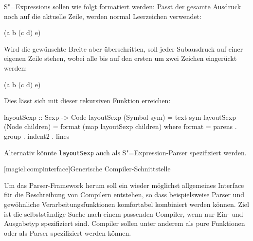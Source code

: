 \documentclass[11pt, a4paper, bibgerm]{scrbook}
\newcommand\icode[1]{\lstinline?#1?}
\newcommand\lsection{}
\newcommand{\sexp}{S"=Expression}
\newcommand{\sexps}{S"=Expressions}
\begin{document}
\sexps{} sollen wie folgt formatiert werden: Passt der gesamte Ausdruck
noch auf die aktuelle Zeile, werden normal Leerzeichen verwendet:
\begin{code}
(a b (c d) e)
\end{code}
Wird die gewünschte Breite aber überschritten, soll jeder Subausdruck
auf einer eigenen Zeile stehen, wobei alle bis auf den ersten um zwei
Zeichen eingerückt werden:
\begin{code}
(a
  b
  (c d)
  e)
\end{code}
Dies lässt sich mit dieser rekursiven Funktion erreichen:
\begin{code}
layoutSexp :: Sexp -> Code
layoutSexp (Symbol sym)    = text sym
layoutSexp (Node children) = format (map layoutSexp children)
  where format = parens . group . indent2 . lines
\end{code} %
Alternativ könnte \icode{layoutSexp} auch als \sexp{}-Parser
spezifiziert werden.

\lsection[magicl:compinterface]{Generische Compiler-Schnittstelle}

Um das Parser-Framework herum soll ein wieder möglichst allgemeines
Interface für die Beschreibung von Compilern entstehen, so dass
beispielsweise Parser und gewöhnliche Verarbeitungsfunktionen
komfortabel kombiniert werden können. Ziel ist die selbstständige Suche
nach einem passenden Compiler, wenn nur Ein- und Ausgabetyp spezifiziert
sind. Compiler sollen unter anderem als pure Funktionen oder als Parser
spezifiziert werden können.
\end{document}
